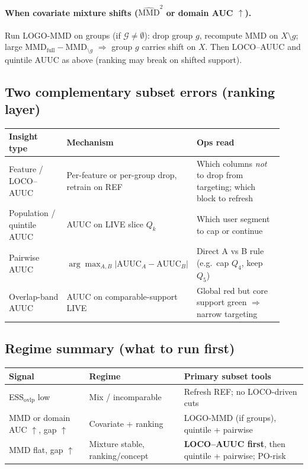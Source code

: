\paragraph{When covariate mixture shifts ($\widehat{\mathrm{MMD}}^2$ or domain AUC $\uparrow$).}
Run LOGO-MMD on groups (if $\mathcal{G}\neq\emptyset$): drop group $g$, recompute MMD on $X\setminus g$; large $\mathrm{MMD}_{\mathrm{full}}-\mathrm{MMD}_{\setminus g}$ $\Rightarrow$ group $g$ carries shift on $X$.
Then LOCO--AUUC and quintile AUUC as above (ranking may break on shifted support).

\subsection{Two complementary subset errors (ranking layer)}

\begin{center}
\begin{tabular}{@{}p{0.22\linewidth}p{0.34\linewidth}p{0.36\linewidth}@{}}
\toprule
\textbf{Insight type} & \textbf{Mechanism} & \textbf{Ops read} \\
\midrule
Feature / LOCO--AUUC &
Per-feature or per-group drop, retrain on REF &
Which columns \emph{not} to drop from targeting; which block to refresh \\
Population / quintile AUUC &
AUUC on LIVE slice $Q_k$ &
Which user segment to cap or continue \\
Pairwise AUUC &
$\arg\max_{A,B}|\mathrm{AUUC}_A-\mathrm{AUUC}_B|$ &
Direct A vs B rule (e.g.\ cap $Q_4$, keep $Q_5$) \\
Overlap-band AUUC &
AUUC on comparable-support LIVE &
Global red but core support green $\Rightarrow$ narrow targeting \\
\bottomrule
\end{tabular}
\end{center}

\subsection{Regime summary (what to run first)}

\begin{center}
\small
\begin{tabular}{@{}lll@{}}
\toprule
Signal & Regime & Primary subset tools \\
\midrule
ESS$_{\mathrm{ovlp}}$ low & Mix / incomparable & Refresh REF; no LOCO-driven cuts \\
MMD or domain AUC $\uparrow$, gap $\uparrow$ & Covariate + ranking & LOGO-MMD (if groups), quintile + pairwise \\
MMD flat, gap $\uparrow$ & Mixture stable, ranking/concept & \textbf{LOCO--AUUC first}, then quintile + pairwise; PO-risk \\
\bottomrule
\end{tabular}
\end{center}

